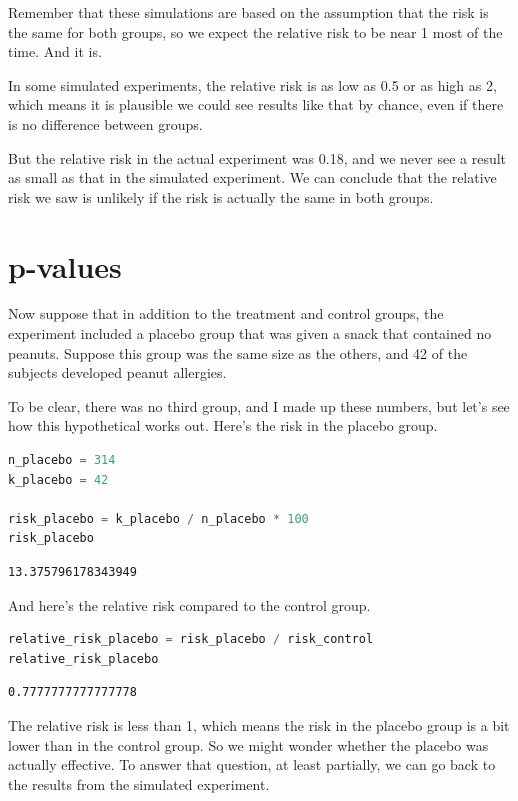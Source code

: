 Remember that these simulations are based on the assumption that the
risk is the same for both groups, so we expect the relative risk to be
near 1 most of the time. And it is.

In some simulated experiments, the relative risk is as low as 0.5 or as
high as 2, which means it is plausible we could see results like that by
chance, even if there is no difference between groups.

But the relative risk in the actual experiment was 0.18, and we never
see a result as small as that in the simulated experiment. We can
conclude that the relative risk we saw is unlikely if the risk is
actually the same in both groups.

\hypertarget{p-values}{%
\section{p-values}\label{p-values}}

Now suppose that in addition to the treatment and control groups, the
experiment included a placebo group that was given a snack that
contained no peanuts. Suppose this group was the same size as the
others, and 42 of the subjects developed peanut allergies.

To be clear, there was no third group, and I made up these numbers, but
let's see how this hypothetical works out. Here's the risk in the
placebo group.

\begin{lstlisting}[language=Python,style=source]
n_placebo = 314
k_placebo = 42

risk_placebo = k_placebo / n_placebo * 100
risk_placebo
\end{lstlisting}

\begin{lstlisting}[style=output]
13.375796178343949
\end{lstlisting}

And here's the relative risk compared to the control group.

\begin{lstlisting}[language=Python,style=source]
relative_risk_placebo = risk_placebo / risk_control
relative_risk_placebo
\end{lstlisting}

\begin{lstlisting}[style=output]
0.7777777777777778
\end{lstlisting}

The relative risk is less than 1, which means the risk in the placebo
group is a bit lower than in the control group. So we might wonder
whether the placebo was actually effective. To answer that question, at
least partially, we can go back to the results from the simulated
experiment.

